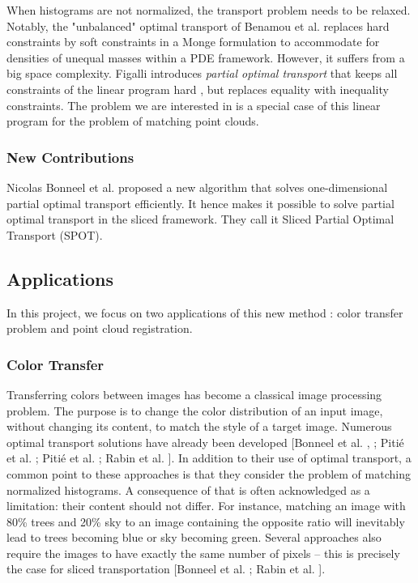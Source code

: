 \documentclass[a4paper,12pt]{article}
\begin{document}
When histograms are not normalized, the transport problem needs to be relaxed. Notably, the "unbalanced" optimal transport of Benamou et al. \cite{benamou2003numerical} replaces hard constraints by soft constraints in a Monge formulation to accommodate for densities of unequal masses within a PDE framework. However, it suffers from a big space complexity. Figalli introduces \textit{partial optimal transport} that keeps all constraints of the linear program hard \cite{figalli2010optimal}, but replaces equality with inequality constraints. The problem we are interested in is a special case of this linear program for the problem of matching point clouds.

\subsubsection*{New Contributions}

Nicolas Bonneel et al. \cite{BC19} proposed a new algorithm that solves one-dimensional partial optimal transport efficiently. It hence makes it possible to solve partial optimal transport in the sliced framework. They call it Sliced Partial Optimal Transport (SPOT).

\subsection*{Applications}

In this project, we focus on two applications of this new method : color transfer problem and point cloud registration.

\subsubsection*{Color Transfer}

Transferring colors between images has become a classical image processing problem. The purpose is to change the color distribution of an input image, without changing its content, to match the style of a target image. Numerous optimal transport solutions have already been developed [Bonneel et al. \cite{bonneel2015sliced}, \cite{bonneel2013example}; Pitié et al. \cite{pitie2005n}; Pitié et al. \cite{pitie2007automated}; Rabin et al. \cite{rabin2010regularization}]. In addition to their use of optimal transport, a common point to these approaches is that they consider the problem of matching normalized histograms. A consequence of that is often acknowledged as a limitation: their content should not differ. For instance, matching an image with 80\% trees and 20\% sky to an image containing the opposite ratio will inevitably lead to trees becoming blue or sky becoming green. Several approaches also require the images to have exactly the same number of pixels – this is precisely the case for sliced transportation [Bonneel et al. \cite{bonneel2015sliced}; Rabin et al. \cite{rabin2010regularization}].
\end{document}
